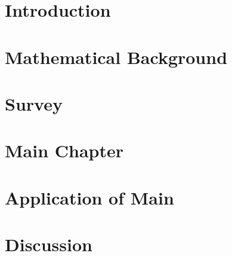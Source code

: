 \documentclass[12pt]{report}
\begin{document}
\beforepreface                      

\newpage






\afterpreface


\chapter{Introduction}
\label{cha:introduction}

      

\chapter{Mathematical Background}
\label{cha:mathematical_background}



\chapter{Survey}
\label{cha:lit_survey}



\chapter{Main Chapter}
\label{cha:main_chapter}



\chapter{Application of Main}
\label{cha:application_of_main}



\chapter{Discussion}
\label{cha:discussion}

\end{document}
